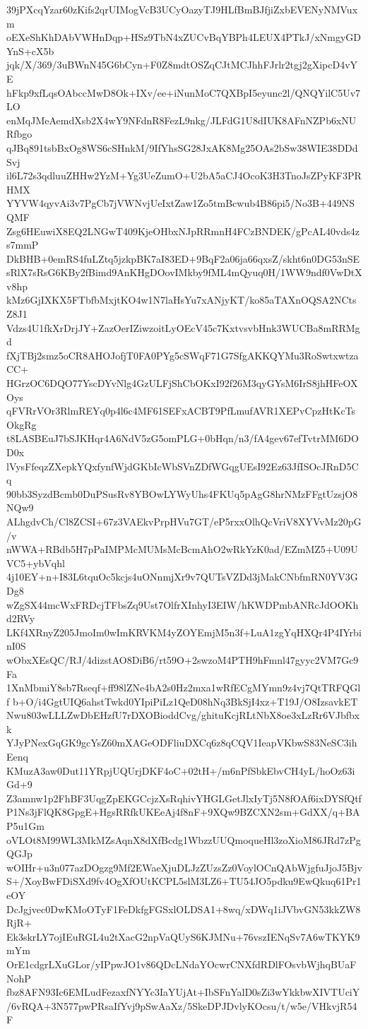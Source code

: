 39jPXcqYzar60zKifs2qrUIMogVcB3UCyOazyTJ9HLfBmBJfjiZxbEVENyNMVuxm
oEXeShKhDAbVWHnDqp+HSz9TbN4xZUCvBqYBPh4LEUX4PTkJ/xNmgyGDYnS+cX5b
jqk/X/369/3uBWnN45G6bCyn+F0Z8mdtOSZqCJtMCJhhFJrlr2tgj2gXipcD4vYE
hFkp9xfLqsOAbccMwD8Ok+IXv/ee+iNunMoC7QXBpI5eyunc2l/QNQYilC5Uv7LO
enMqJMeAemdXsb2X4wY9NFdnR8FezL9nkg/JLFdG1U8dIUK8AFnNZPb6xNURfbgo
qJBq891tsbBxOg8WS6cSHnkM/9IfYhsSG28JxAK8Mg25OAs2bSw38WIE38DDdSvj
il6L72s3qdluuZHHw2YzM+Yg3UeZumO+U2bA5aCJ4OcoK3H3TnoJsZPyKF3PRHMX
YYVW4qyvAi3v7PgCb7jVWNvjUeIxtZaw1Zo5tmBcwub4B86pi5/No3B+449NSQMF
Zsg6HEuwiX8EQ2LNGwT409KjeOHbxNJpRRmnH4FCzBNDEK/gPcAL40vds4zs7mmP
DkBHB+0emRS4fuLZtq5jzkpBK7aI83ED+9BqF2a06ja66qxsZ/skht6n0DG53nSE
sRlX7sRsG6KBy2fBimd9AnKHgDOovIMkby9fML4mQyuq0H/1WW9ndf0VwDtXv8hp
kMz6GjIXKX5FTbfbMxjtKO4w1N7laHsYu7xANjyKT/ko85aTAXnOQSA2NCtsZ8J1
Vdzs4U1fkXrDrjJY+ZazOerIZiwzoitLyOEcV45c7KxtvsvbHnk3WUCBa8mRRMgd
fXjTBj2smz5oCR8AHOJofjT0FA0PYg5cSWqF71G7SfgAKKQYMu3RoSwtxwtzaCC+
HGrzOC6DQO77YscDYvNlg4GzULFjShCbOKxI92f26M3qyGYsM6IrS8jhHFeOXOys
qFVRrVOr3RlmREYq0p4l6c4MF61SEFxACBT9PfLmufAVR1XEPvCpzHtKcTsOkgRg
t8LASBEuJ7bSJKHqr4A6NdV5zG5omPLG+0bHqn/n3/fA4gev67efTvtrMM6DOD0x
lVysFfeqzZXepkYQxfynfWjdGKbIcWbSVnZDfWGqgUEsI92Ez63JfISOcJRnD5Cq
90bb3SyzdBcmb0DuPSusRv8YBOwLYWyUhs4FKUq5pAgG8hrNMzFFgtUzsjO8NQw9
ALhgdvCh/Cl8ZCSI+67z3VAEkvPrpHVu7GT/eP5rxxOlhQcVriV8XYVvMz20pG/v
nWWA+RBdb5H7pPaIMPMcMUMsMcBcmAhO2wRkYzK0ad/EZmMZ5+U09UVC5+ybVqhl
4j10EY+n+I83L6tquOc5kcjs4uONnmjXr9v7QUTsVZDd3jMakCNbfmRN0YV3GDg8
wZgSX44mcWxFRDcjTFbsZq9Ust7OlfrXInhyI3EIW/hKWDPmbANRcJdOOKhd2RVy
LKf4XRnyZ205JmoIm0wImKRVKM4yZOYEmjM5n3f+LuA1zgYqHXQr4P4IYrbinI0S
wObxXEsQC/RJ/4dizstAO8DiB6/rt59O+2swzoM4PTH9hFmnl47gyyc2VM7Gc9Fa
1XnMbmiY8sb7Rseqf+ff98lZNe4bA2s0Hz2mxa1wRfECgMYmn9z4vj7QtTRFQGlf
b+O/i4GgtUIQ6ahstTwkd0YIpiPiLz1QeD08hNq3BkSjI4xz+T19J/O8IzsavkET
Nwu803wLLLZwDbEHzfU7rDXOBioddCvg/ghituKcjRLtNbX8oe3xLzRr6VJbfbxk
YJyPNexGqGK9gcYsZ60mXAGeODFliuDXCq6z8qCQV1IeapVKbwS83NeSC3ihEenq
KMuzA3aw0Dut11YRpjUQUrjDKF4oC+02tH+/m6nPfSbkEbvCH4yL/hoOz63iGd+9
Z3amnw1p2FhBF3UqgZpEKGCcjzXsRqhivYHGLGetJlxIyTj5N8fOAf6ixDYSfQtf
P1Ns3jFlQK8GpgE+HgsRRfkUKEeAj4f8nF+9XQw9BZCXN2sm+GdXX/q+BAP5u1Gm
oVLOt8M99WL3MkMZsAqnX8dXfBcdg1WbzzUUQmoqueHl3zoXioM86JRd7zPgQGJp
wOIHr+u3n077azDOgzg9Mf2EWaeXjuDLJzZUzsZz0VoylOCnQAbWjgfuJjoJ5Bjv
S+/XoyBwFDiSXd9fv4OgXfOUtKCPL5slM3LZ6+TU54JO5pdku9EwQkuq61Pr1eOY
DcJgjvec0DwKMoOTyF1FeDkfgFGSxlOLDSA1+8wq/xDWq1iJVbvGN53kkZW8RjR+
Ek3skrLY7ojIEuRGL4u2tXacG2npVaQUyS6KJMNu+76vszIENqSv7A6wTKYK9mYm
OrE1cdgrLXuGLor/yIPpwJO1v86QDcLNdaYOcwrCNXfdRDlFOsvbWjhqBUaFNohP
fbz8AFN93Ic6EMLudFezaxfNYYc3IaYUjAt+IbSFnYalD0sZi3wYkkbwXIVTUciY
/6vRQA+3N577pwPRsaIfYvj9pSwAaXz/5SkeDPJDvlyKOcsu/t/w5e/VHkvjR54F

